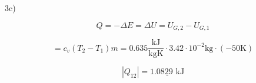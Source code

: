 3c)

\[
Q = -\Delta E = \Delta U = U_{G,2} - U_{G,1}
\]

\[
= c_v (T_2 - T_1) m = 0.635 \frac{\text{kJ}}{\text{kgK}} \cdot 3.42 \cdot 10^{-2} \text{kg} \cdot (-50 \text{K})
\]

\[
|Q_{12}| = \underline{1.0829 \text{ kJ}}
\]